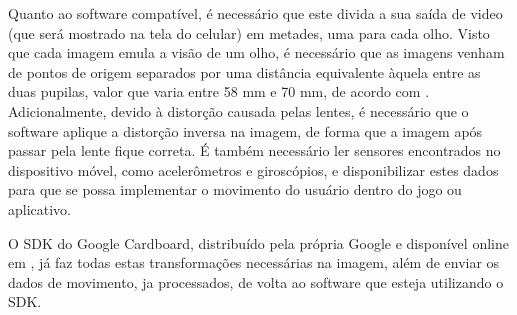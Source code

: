 Quanto ao software compatível, é necessário que este divida a sua saída de video (que será mostrado na tela do celular) em metades, uma para cada olho. Visto que cada imagem emula a visão de um olho, é necessário que as imagens venham de pontos de origem separados por uma distância equivalente àquela entre as duas pupilas, valor que varia entre 58 mm e 70 mm, de acordo com \cite{dodgson:2004:svariation}. Adicionalmente, devido à distorção causada pelas lentes, é necessário que o software aplique a distorção inversa na imagem, de forma que a imagem após passar pela lente fique correta. É também necessário ler sensores encontrados no dispositivo móvel, como acelerômetros e giroscópios, e disponibilizar estes dados para que se possa implementar o movimento do usuário dentro do jogo ou aplicativo.

O SDK do Google Cardboard, distribuído pela própria Google e disponível online em \cite{google:2016:cardboardSDK}, já faz todas estas transformações necessárias na imagem, além de enviar os dados de movimento, ja processados, de volta ao software que esteja utilizando o SDK.